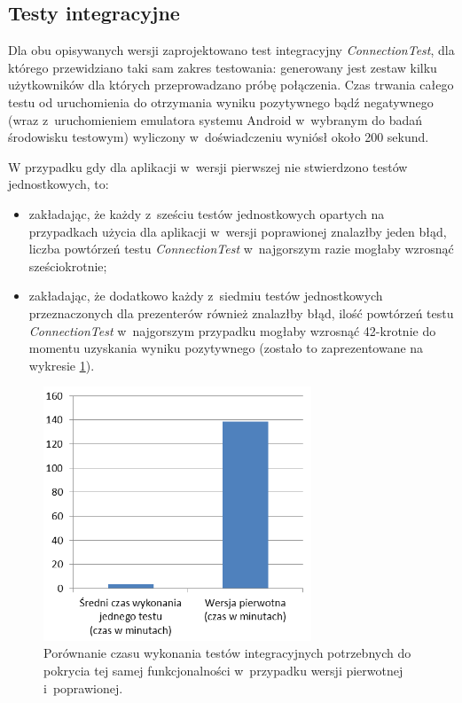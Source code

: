 \subsection{Testy integracyjne}
Dla obu opisywanych wersji zaprojektowano test integracyjny \textit{ConnectionTest}, dla którego przewidziano taki sam zakres testowania: generowany jest zestaw kilku użytkowników dla których przeprowadzano próbę połączenia. Czas trwania całego testu od uruchomienia do otrzymania wyniku pozytywnego bądź negatywnego (wraz z~uruchomieniem emulatora systemu Android w~wybranym do badań środowisku testowym) wyliczony w~doświadczeniu wyniósł około 200 sekund. 

W przypadku gdy dla aplikacji w~wersji pierwszej nie stwierdzono testów jednostkowych, to:
\begin{itemize}
\item
zakładając, że każdy z~sześciu testów jednostkowych opartych na przypadkach użycia dla aplikacji w~wersji poprawionej znalazłby jeden błąd, liczba powtórzeń testu \textit{ConnectionTest} w~najgorszym razie mogłaby wzrosnąć sześciokrotnie;
\item
zakładając, że dodatkowo każdy z~siedmiu testów jednostkowych przeznaczonych dla prezenterów również znalazłby błąd, ilość powtórzeń testu \textit{ConnectionTest} w~najgorszym przypadku mogłaby wzrosnąć 42-krotnie do momentu uzyskania wyniku pozytywnego (zostało to zaprezentowane na wykresie \ref{fig:app_int_czas}).
\end{itemize}
\begin{figure}[!htb]
    \centering
    \includegraphics[width=8cm]{imgs/ch6_app_int_czas.png}
    \caption
{Porównanie czasu wykonania testów integracyjnych potrzebnych do pokrycia tej samej funkcjonalności w~przypadku wersji pierwotnej i~poprawionej. }
    \label{fig:app_int_czas}
\end{figure} 

